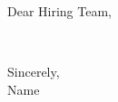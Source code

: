 \documentclass[11pt,letterpaper]{letter}
\begin{document}
\address{Name \\ City \\ Email \\ Phone \\ \today}
\date{} %
\begin{letter}{}
\opening{Dear {\companyname} Hiring Team,}
\\
\closing{Sincerely, \\ Name}
\end{letter}

\end{document}
